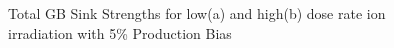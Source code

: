 \documentclass[a4paper]{article}
\begin{document}
      \begin{figure}[h!]  %
        \centering
        \qquad
        \caption{Total GB Sink Strengths for low(a) and high(b) dose rate ion irradiation with 5\% Production Bias}
        \label{figure:sink_strengths_ion_5_1e-3}
      \end{figure}
\end{document}
